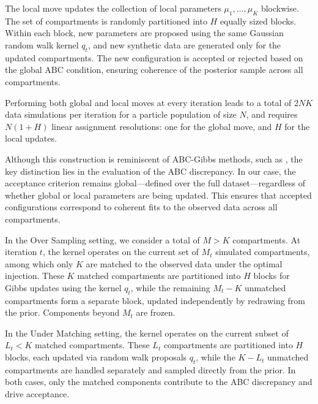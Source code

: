\documentclass[11pt,a4paper]{article}
\def\locparam{\mu}
\theoremstyle{plain}
\theoremstyle{definition}
\theoremstyle{remark}
\begin{document}
The local move updates the collection of local parameters \( \locparam_1, \dots, \locparam_K \) blockwise. The set of compartments is randomly partitioned into \( H \) equally sized blocks. Within each block, new parameters are proposed using the same Gaussian random walk kernel \( q_t \), and new synthetic data are generated only for the updated compartments. The new configuration is accepted or rejected based on the global ABC condition, ensuring coherence of the posterior sample across all compartments.

Performing both global and local moves at every iteration leads to a total of \( 2NK \) data simulations per iteration for a particle population of size \( N \), and requires \( N(1 + H) \) linear assignment resolutions: one for the global move, and \( H \) for the local updates.

Although this construction is reminiscent of ABC-Gibbs methods, such as \citet{clarte2021componentwise}, the key distinction lies in the evaluation of the ABC discrepancy. In our case, the acceptance criterion remains global—defined over the full dataset—regardless of whether global or local parameters are being updated. This ensures that accepted configurations correspond to coherent fits to the observed data across all compartments.

In the Over Sampling setting, we consider a total of \( M > K \) compartments. At iteration \( t \), the kernel operates on the current set of \( M_t \) simulated compartments, among which only \( K \) are matched to the observed data under the optimal injection. These \( K \) matched compartments are partitioned into \( H \) blocks for Gibbs updates using the kernel \( q_t \), while the remaining \( M_t - K \) unmatched compartments form a separate block, updated independently by redrawing from the prior. Components beyond \( M_t \) are frozen.

In the Under Matching setting, the kernel operates on the current subset of \( L_t < K \) matched compartments. These \( L_t \) compartments are partitioned into \( H \) blocks, each updated via random walk proposals \( q_t \), while the \( K - L_t \) unmatched compartments are handled separately and sampled directly from the prior. In both cases, only the matched components contribute to the ABC discrepancy and drive acceptance.
\end{document}
